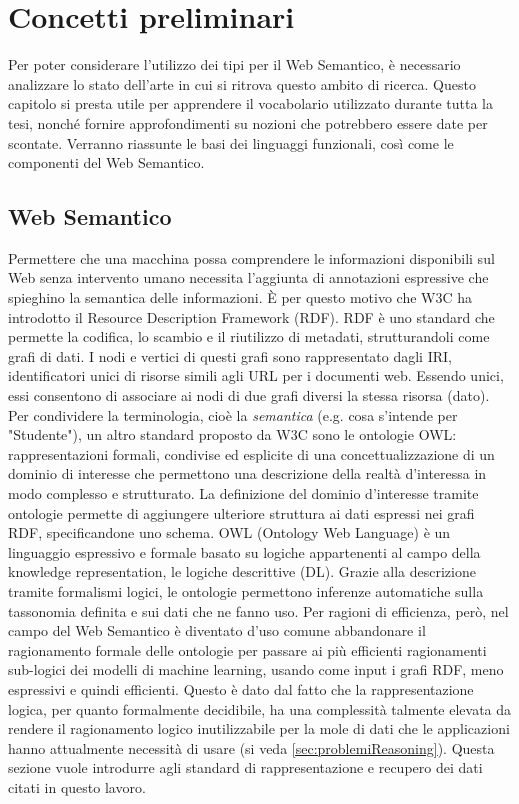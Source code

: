 \chapter[Concetti preliminari]{Concetti preliminari}
Per poter considerare l'utilizzo dei tipi per il Web Semantico, è necessario analizzare lo stato dell'arte in cui si ritrova questo ambito di ricerca.
Questo capitolo si presta utile per apprendere il vocabolario utilizzato durante tutta la tesi, nonché fornire approfondimenti su nozioni che potrebbero essere date per scontate.
Verranno riassunte le basi dei linguaggi funzionali, così come le componenti del Web Semantico.

\section[Web Semantico]{Web Semantico}
Permettere che una macchina possa comprendere le informazioni disponibili sul Web senza intervento umano \cite{berners2001semantic} necessita l'aggiunta di annotazioni espressive che spieghino la semantica delle informazioni. È per questo motivo che W3C ha introdotto il Resource Description Framework (RDF). RDF è uno standard che permette la codifica, lo scambio e il riutilizzo di metadati, strutturandoli come grafi di dati. I nodi e vertici di questi grafi sono rappresentato dagli IRI, identificatori unici di risorse simili agli URL per i documenti web. Essendo unici, essi consentono di associare ai nodi di due grafi diversi la stessa risorsa (dato). Per condividere la terminologia, cioè la \textit{semantica} (e.g. cosa s'intende per "Studente"), un altro standard proposto da W3C sono le ontologie OWL: rappresentazioni formali, condivise ed esplicite di una concettualizzazione di un dominio di interesse \cite{goy2015ontologies} che permettono una descrizione della realtà d'interessa in modo complesso e strutturato. La definizione del dominio d'interesse tramite ontologie permette di aggiungere ulteriore struttura ai dati espressi nei grafi RDF, specificandone uno schema. OWL (Ontology Web Language) è un linguaggio espressivo e formale basato su logiche appartenenti al campo della knowledge representation, le logiche descrittive (DL). Grazie alla descrizione tramite formalismi logici, le ontologie permettono inferenze automatiche sulla tassonomia definita e sui dati che ne fanno uso. Per ragioni di efficienza, però, nel campo del Web Semantico è diventato d'uso comune abbandonare il ragionamento formale delle ontologie per passare ai più efficienti ragionamenti sub-logici dei modelli di machine learning, usando come input i grafi RDF, meno espressivi e quindi efficienti. Questo è dato dal fatto che la rappresentazione logica, per quanto formalmente decidibile, ha una complessità talmente elevata da rendere il ragionamento logico inutilizzabile per la mole di dati che le applicazioni hanno attualmente necessità di usare (si veda \autoref{sec:problemiReasoning}). Questa sezione vuole introdurre agli standard di rappresentazione e recupero dei dati citati in questo lavoro.

